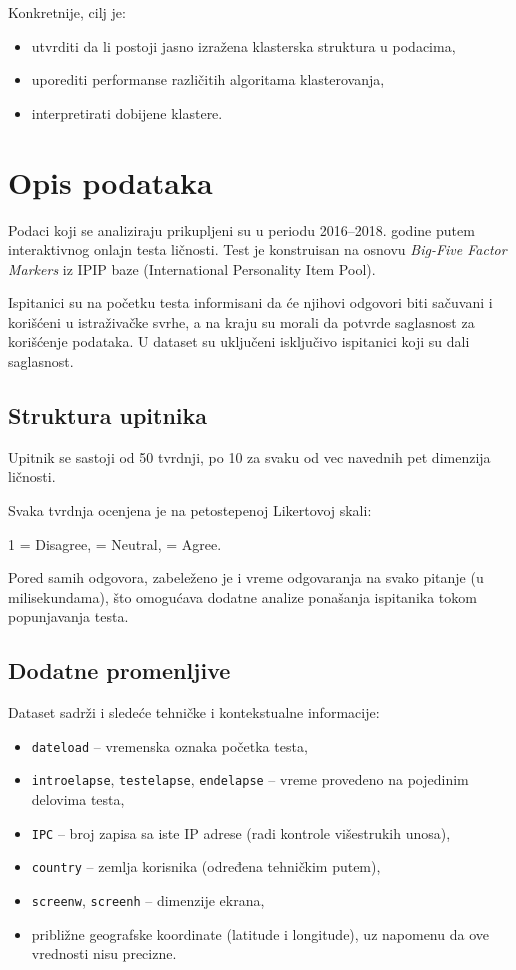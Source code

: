 \documentclass[12pt,a4paper]{article}
\begin{document}
Konkretnije, cilj je:
\begin{itemize}
    \item utvrditi da li postoji jasno izražena klasterska struktura u podacima,
    \item uporediti performanse različitih algoritama klasterovanja,
    \item interpretirati dobijene klastere.
\end{itemize}

\section{Opis podataka}

Podaci koji se analiziraju prikupljeni su u periodu 2016--2018. godine putem interaktivnog onlajn testa ličnosti. Test je konstruisan na osnovu \textit{Big-Five Factor Markers} iz IPIP baze (International Personality Item Pool).

Ispitanici su na početku testa informisani da će njihovi odgovori biti sačuvani i korišćeni u istraživačke svrhe, a na kraju su morali da potvrde saglasnost za korišćenje podataka. U dataset su uključeni isključivo ispitanici koji su dali saglasnost.

\subsection{Struktura upitnika}

Upitnik se sastoji od 50 tvrdnji, po 10 za svaku od vec navednih pet dimenzija ličnosti.


Svaka tvrdnja ocenjena je na petostepenoj Likertovoj skali:
\begin{center}
1 = Disagree,  = Neutral,  = Agree.
\end{center}

Pored samih odgovora, zabeleženo je i vreme odgovaranja na svako pitanje (u milisekundama), što omogućava dodatne analize ponašanja ispitanika tokom popunjavanja testa.

\subsection{Dodatne promenljive}

Dataset sadrži i sledeće tehničke i kontekstualne informacije:

\begin{itemize}
    \item \texttt{dateload} -- vremenska oznaka početka testa,
    \item \texttt{introelapse}, \texttt{testelapse}, \texttt{endelapse} -- vreme provedeno na pojedinim delovima testa,
    \item \texttt{IPC} -- broj zapisa sa iste IP adrese (radi kontrole višestrukih unosa),
    \item \texttt{country} -- zemlja korisnika (određena tehničkim putem),
    \item \texttt{screenw}, \texttt{screenh} -- dimenzije ekrana,
    \item približne geografske koordinate (latitude i longitude), uz napomenu da ove vrednosti nisu precizne.
\end{itemize}
\end{document}
